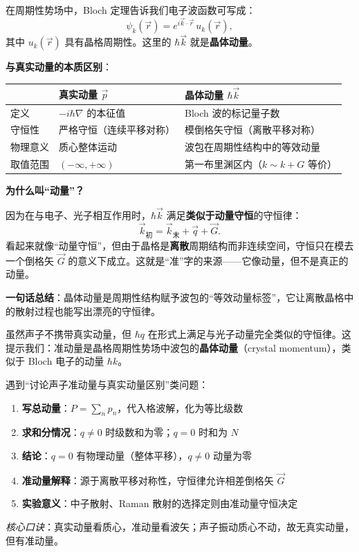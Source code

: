 \begin{insightbox}
\begin{insightbox}
在周期性势场中，Bloch 定理告诉我们电子波函数可写成：
\[
\psi_k(\vec r) = e^{i\vec k\cdot\vec r}\,u_k(\vec r),
\]
其中 $u_k(\vec r)$ 具有晶格周期性。这里的 $\hbar\vec k$ 就是\textbf{晶体动量}。

\textbf{与真实动量的本质区别}：
\begin{center}
\begin{tabular}{lll}
\toprule
 & \textbf{真实动量} $\vec p$ & \textbf{晶体动量} $\hbar\vec k$ \\
\midrule
定义 & $-i\hbar\nabla$ 的本征值 & Bloch 波的标记量子数 \\
守恒性 & 严格守恒（连续平移对称） & 模倒格矢守恒（离散平移对称） \\
物理意义 & 质心整体运动 & 波包在周期性结构中的等效动量 \\
取值范围 & $(-\infty,+\infty)$ & 第一布里渊区内（$k\sim k+G$ 等价） \\
\bottomrule
\end{tabular}
\end{center}

\textbf{为什么叫``动量''？}

因为在与电子、光子相互作用时，$\hbar\vec k$ 满足\textbf{类似于动量守恒}的守恒律：
\[
\vec k_{\text{初}} = \vec k_{\text{末}} + \vec q + \vec G.
\]
看起来就像``动量守恒''，但由于晶格是\textbf{离散}周期结构而非连续空间，守恒只在模去一个倒格矢 $\vec G$ 的意义下成立。这就是``准''字的来源——它像动量，但不是真正的动量。

\textbf{一句话总结}：晶体动量是周期性结构赋予波包的``等效动量标签''，它让离散晶格中的散射过程也能写出漂亮的守恒律。
\end{insightbox}

虽然声子不携带真实动量，但 $\hbar q$ 在形式上满足与光子动量完全类似的守恒律。这提示我们：准动量是晶格周期性势场中波包的\textbf{晶体动量}（crystal momentum），类似于 Bloch 电子的动量 $\hbar k$。
\end{insightbox}

\begin{thinkbox}
遇到``讨论声子准动量与真实动量区别''类问题：
\begin{enumerate}
    \item \textbf{写总动量}：$P=\sum_n p_n$，代入格波解，化为等比级数
    \item \textbf{求和分情况}：$q\neq0$ 时级数和为零；$q=0$ 时和为 $N$
    \item \textbf{结论}：$q=0$ 有物理动量（整体平移），$q\neq0$ 动量为零
    \item \textbf{准动量解释}：源于离散平移对称性，守恒律允许相差倒格矢 $\vec G$
    \item \textbf{实验意义}：中子散射、Raman 散射的选择定则由准动量守恒决定
\end{enumerate}
\textit{核心口诀}：真实动量看质心，准动量看波矢；声子振动质心不动，故无真实动量，但有准动量。
\end{thinkbox}
